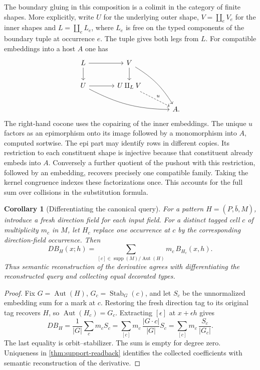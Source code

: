 \documentclass[11pt,a4paper]{article}
\newtheorem{corollary}[corollary]{Corollary}
\theoremstyle{definition}
\theoremstyle{remark}\newaliascnt{remark}{theorem}
\numberwithin{equation}{section}
\begin{document}
The boundary gluing in this composition is a colimit in the category of finite shapes. More explicitly, write \(U\) for the underlying outer shape, \(V=\coprod_e V_e\) for the inner shapes and \(L=\coprod_e L_e\), where \(L_e\) is free on the typed components of the boundary tuple at occurrence \(e\). The tuple gives both legs from \(L\). For compatible embeddings into a host \(A\) one has
\[
\begin{tikzcd}[column sep=large,row sep=normal]
 L\arrow[r]\arrow[d]&V\arrow[d]\arrow[ddr,bend left=13]\\
 U\arrow[r]\arrow[drr,bend right=13]&U\amalg_L V\arrow[dr,dashed,"u"]\\
 &&A .
\end{tikzcd}
\]
The right-hand cocone uses the copairing of the inner embeddings. The unique \(u\) factors as an epimorphism onto its image followed by a monomorphism into \(A\), computed sortwise. The epi part may identify rows in different copies. Its restriction to each constituent shape is injective because that constituent already embeds into \(A\). Conversely a further quotient of the pushout with this restriction, followed by an embedding, recovers precisely one compatible family. Taking the kernel congruence indexes these factorizations once. This accounts for the full sum over collisions in the substitution formula.
\begin{corollary}[Differentiating the canonical query]\label{cor:normal-form-derivative}
For a pattern $H=(P,\bar b,M)$, introduce a fresh direction field for each input field. For a distinct tagged cell $c$ of multiplicity $m_c$ in $M$, let $H_c$ replace one occurrence at $c$ by the corresponding direction-field occurrence. Then
\[
 D B_H(x;h)=
 \sum_{[c]\in\operatorname{supp}(M)/\operatorname{Aut}(H)}
                 m_c\,B_{H_c}(x,h).
\]
Thus semantic reconstruction of the derivative agrees with differentiating the reconstructed query and collecting equal decorated types.
\end{corollary}
\begin{proof}
Fix \(G=\operatorname{Aut}(H)\), \(G_c=\operatorname{Stab}_G(c)\), and let \(S_c\) be the unnormalized embedding sum for a mark at \(c\). Restoring the fresh direction tag to its original tag recovers \(H\), so \(\operatorname{Aut}(H_c)=G_c\). Extracting \([\epsilon]\) at \(x+\epsilon h\) gives
\[
 DB_H=\frac1{|G|}\sum_c m_c S_c
    =\sum_{[c]}m_c\,\frac{|G\cdot c|}{|G|}S_c
    =\sum_{[c]}m_c\,\frac{S_c}{|G_c|}.
\]
The last equality is orbit--stabilizer. The sum is empty for degree zero. Uniqueness in \cref{thm:support-readback} identifies the collected coefficients with semantic reconstruction of the derivative.
\end{proof}
\end{document}
